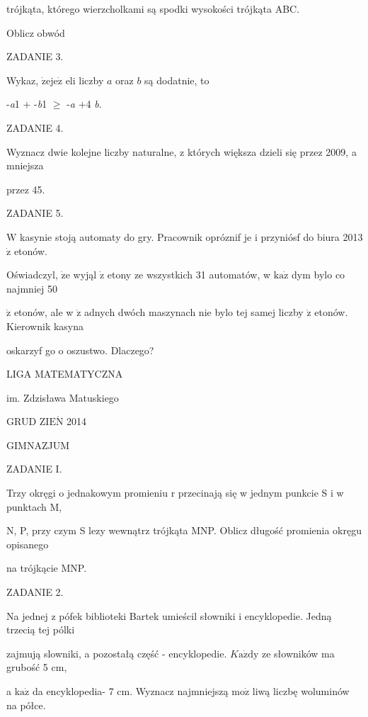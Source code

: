 \documentclass[a4paper,12pt]{article}
\begin{document}
trójkąta, którego wierzcholkami są spodki wysokości trójkąta ABC.

Oblicz obwód

ZADANIE 3.

Wykaz, $\dot{\mathrm{z}}\mathrm{e}\mathrm{j}\mathrm{e}\dot{\mathrm{z}}$ eli liczby $a$ oraz $b$ są dodatnie, to

-{\it a}1 $+$ -{\it b}1 $\geq$ -{\it a} $+$4 {\it b}.

ZADANIE 4.

Wyznacz dwie kolejne liczby naturalne, z których większa dzieli się przez 2009, a mniejsza

przez 45.

ZADANIE 5.

$\mathrm{W}$ kasynie stoją automaty do gry. Pracownik opróznif je i przyniósf do biura 2013 $\dot{\mathrm{z}}$ etonów.

Oświadczyl, $\dot{\mathrm{z}}\mathrm{e}$ wyjąl $\dot{\mathrm{z}}$ etony ze wszystkich 31 automatów, w $\mathrm{k}\mathrm{a}\dot{\mathrm{z}}$ dym bylo co najmniej 50

$\dot{\mathrm{z}}$ etonów, ale w $\dot{\mathrm{z}}$ adnych dwóch maszynach nie bylo tej samej liczby $\dot{\mathrm{z}}$ etonów. Kierownik kasyna

oskarzyf go o oszustwo. Dlaczego?






LIGA MATEMATYCZNA

im. Zdzisława Matuskiego

GRUD Z$\mathrm{I}\mathrm{E}\acute{\mathrm{N}}$ 2014

GIMNAZJUM

ZADANIE I.

Trzy okręgi o jednakowym promieniu r przecinają się w jednym punkcie S i w punktach M,

N, P, przy czym S lezy wewnątrz trójkąta MNP. Oblicz długość promienia okręgu opisanego

na trójkącie MNP.

ZADANIE 2.

Na jednej z pófek biblioteki Bartek umieścil słowniki i encyklopedie. Jedną trzecią tej pólki

zajmują slowniki, a pozostałą część - encyklopedie. $K\mathrm{a}\dot{\mathrm{z}}\mathrm{d}\mathrm{y}$ ze słowników ma grubość 5 cm,

a $\mathrm{k}\mathrm{a}\dot{\mathrm{z}}$ da encyklopedia- 7 cm. Wyznacz najmniejszą $\mathrm{m}\mathrm{o}\dot{\mathrm{z}}$ liwą liczbę woluminów na półce.
\end{document}
